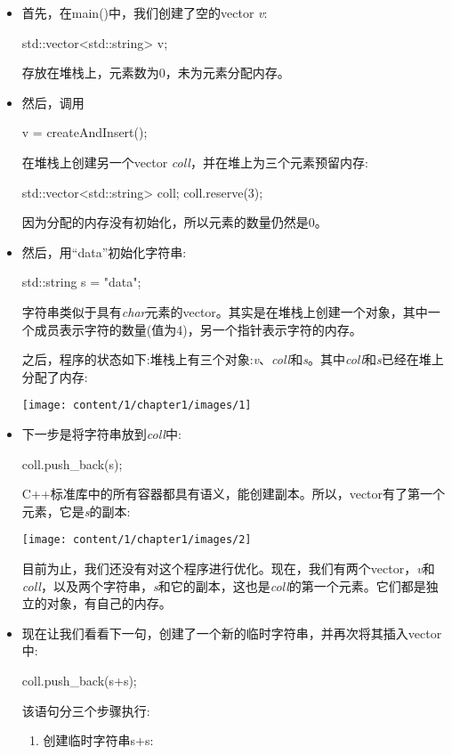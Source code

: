 \begin{itemize}
	\item 首先，在main()中，我们创建了空的vector \textit{v}:
\begin{cppcode}
std::vector<std::string> v;
\end{cppcode}
	存放在堆栈上，元素数为0，未为元素分配内存。
	\item 然后，调用
\begin{cppcode}
v = createAndInsert();
\end{cppcode}
	在堆栈上创建另一个vector \textit{coll}，并在堆上为三个元素预留内存:
\begin{cppcode}
std::vector<std::string> coll;
coll.reserve(3);
\end{cppcode}
	因为分配的内存没有初始化，所以元素的数量仍然是0。
	\item 然后，用“data”初始化字符串:
\begin{cppcode}
std::string s = "data";
\end{cppcode}
	字符串类似于具有\textit{char}元素的vector。其实是在堆栈上创建一个对象，其中一个成员表示字符的数量(值为4)，另一个指针表示字符的内存。

	之后，程序的状态如下:堆栈上有三个对象:\textit{v}、\textit{coll}和\textit{s}。其中\textit{coll}和\textit{s}已经在堆上分配了内存:
\begin{center}
		\texttt{[image: content/1/chapter1/images/1]}
	\end{center}
	\item 下一步是将字符串放到\textit{coll}中:
\begin{cppcode}
coll.push_back(s);
\end{cppcode}
	C++标准库中的所有容器都具有语义，能创建副本。所以，vector有了第一个元素，它是\textit{s}的副本:
\begin{center}
		\texttt{[image: content/1/chapter1/images/2]}
	\end{center}
	目前为止，我们还没有对这个程序进行优化。现在，我们有两个vector，\textit{v}和\textit{coll}，以及两个字符串，\textit{s}和它的副本，这也是\textit{coll}的第一个元素。它们都是独立的对象，有自己的内存。

	\item 现在让我们看看下一句，创建了一个新的临时字符串，并再次将其插入vector中:
\begin{cppcode}
coll.push_back(s+s);
\end{cppcode}
	该语句分三个步骤执行:

	\begin{enumerate}
		\item 创建临时字符串s+s:


\end{enumerate}
\end{itemize}
